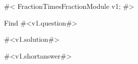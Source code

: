 

#<
FractionTimesFractionModule v1;
#>

Find #<v1.question#>

#<v1.solution#>


#<v1.shortanswer#>


